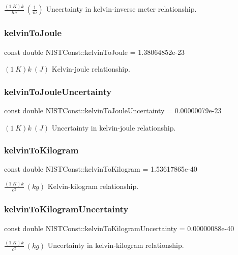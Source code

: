 $\frac{(1\ K)k}{hc} \ (\frac{1}{m})$ Uncertainty in kelvin-\/inverse meter relationship. \mbox{\label{group___kelvin_gae77577280e3dd4a78d41af37076c8f8d}} 
\subsubsection{\texorpdfstring{kelvin\+To\+Joule}{kelvinToJoule}}
{\footnotesize\ttfamily const double N\+I\+S\+T\+Const\+::kelvin\+To\+Joule = 1.\+38064852e-\/23}

$(1\ K)k \ (J)$ Kelvin-\/joule relationship. \mbox{\label{group___kelvin_ga53c28e7735a083676a91272677dd1e89}} 
\subsubsection{\texorpdfstring{kelvin\+To\+Joule\+Uncertainty}{kelvinToJouleUncertainty}}
{\footnotesize\ttfamily const double N\+I\+S\+T\+Const\+::kelvin\+To\+Joule\+Uncertainty = 0.\+00000079e-\/23}

$(1\ K)k \ (J)$ Uncertainty in kelvin-\/joule relationship. \mbox{\label{group___kelvin_gaf5fcf341c9c92f8ede2f402989ae8de1}} 
\subsubsection{\texorpdfstring{kelvin\+To\+Kilogram}{kelvinToKilogram}}
{\footnotesize\ttfamily const double N\+I\+S\+T\+Const\+::kelvin\+To\+Kilogram = 1.\+53617865e-\/40}

$\frac{(1\ K)k}{c^2} \ (kg)$ Kelvin-\/kilogram relationship. \mbox{\label{group___kelvin_gaa6783c525ec480ef30ad433a44bb5f33}} 
\subsubsection{\texorpdfstring{kelvin\+To\+Kilogram\+Uncertainty}{kelvinToKilogramUncertainty}}
{\footnotesize\ttfamily const double N\+I\+S\+T\+Const\+::kelvin\+To\+Kilogram\+Uncertainty = 0.\+00000088e-\/40}

$\frac{(1\ K)k}{c^2} \ (kg)$ Uncertainty in kelvin-\/kilogram relationship. 